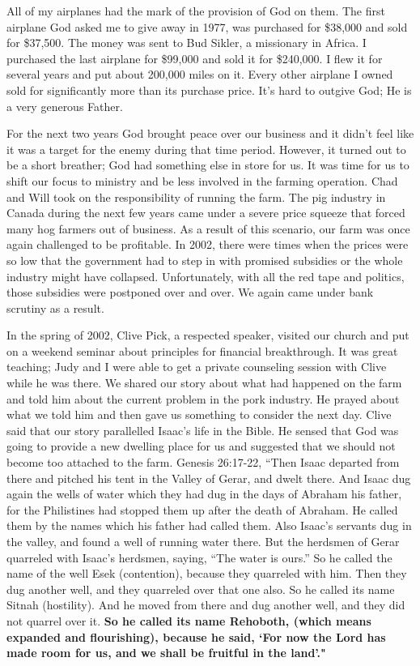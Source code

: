 \documentclass[twoside, 12pt]{book}
\begin{document}
All of my airplanes had the mark of the provision of God on them. The first airplane God asked me to give away in 1977, was purchased for \$38,000 and sold for \$37,500. The money was sent to Bud Sikler, a missionary in Africa. I purchased the last airplane for \$99,000 and sold it for \$240,000. I flew it for several years and put about 200,000 miles on it. Every other airplane I owned sold for significantly more than its purchase price. It’s hard to outgive God; He is a very generous Father.

For the next two years God brought peace over our business and it didn’t feel like it was a target for the enemy during that time period. However, it turned out to be a short breather; God had something else in store for us. It was time for us to shift our focus to ministry and be less involved in the farming operation. Chad and Will took on the responsibility of running the farm. The pig industry in Canada during the next few years came under a severe price squeeze that forced many hog farmers out of business. As a result of this scenario, our farm was once again challenged to be profitable. In 2002, there were times when the prices were so low that the government had to step in with promised subsidies or the whole industry might have collapsed. Unfortunately, with all the red tape and politics, those subsidies were postponed over and over. We again came under bank scrutiny as a result.

In the spring of 2002, Clive Pick, a respected speaker, visited our church and  put on a weekend seminar about principles for financial breakthrough. It was great teaching; Judy and I were able to get a private counseling session with Clive while he was there. We shared our story about what had happened on the farm and told him about the current problem in the pork industry. He prayed about what we told him and then gave us something to consider the next day. Clive said that our story parallelled Isaac's life in the Bible. He sensed that God was going to provide a new dwelling place for us and suggested that we should not become too attached to the farm. Genesis 26:17-22, “Then Isaac departed from there and pitched his tent in the Valley of Gerar, and dwelt there. And Isaac dug again the wells of water which they had dug in the days of Abraham his father, for the Philistines had stopped them up after the death of Abraham. He called them by the names which his father had called them. Also Isaac’s servants dug in the valley, and found a well of running water there. But the herdsmen of Gerar quarreled with Isaac’s herdsmen, saying, “The water is ours.” So he called the name of the well Esek (contention), because they quarreled with him. Then they dug another well, and they quarreled over that one also. So he called its name Sitnah (hostility). And he moved from there and dug another well, and they did not quarrel over it. \textbf{So he called its name Rehoboth, (which means expanded and flourishing), because he said, `For now the Lord has made room for us, and we shall be fruitful in the land'."}
\end{document}
